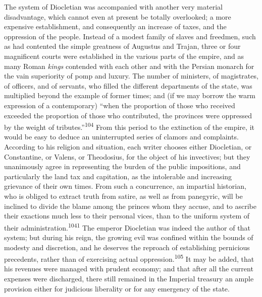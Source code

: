 
The system of Diocletian was accompanied with another very
material disadvantage, which cannot even at present be totally
overlooked; a more expensive establishment, and consequently an
increase of taxes, and the oppression of the people. Instead of a
modest family of slaves and freedmen, such as had contented the
simple greatness of Augustus and Trajan, three or four
magnificent courts were established in the various parts of the
empire, and as many Roman \textit{kings} contended with each other and
with the Persian monarch for the vain superiority of pomp and
luxury. The number of ministers, of magistrates, of officers, and
of servants, who filled the different departments of the state,
was multiplied beyond the example of former times; and (if we may
borrow the warm expression of a contemporary) “when the
proportion of those who received exceeded the proportion of those
who contributed, the provinces were oppressed by the weight of
tributes.”\textsuperscript{104} From this period to the extinction of the empire,
it would be easy to deduce an uninterrupted series of clamors and
complaints. According to his religion and situation, each writer
chooses either Diocletian, or Constantine, or Valens, or
Theodosius, for the object of his invectives; but they
unanimously agree in representing the burden of the public
impositions, and particularly the land tax and capitation, as the
intolerable and increasing grievance of their own times. From
such a concurrence, an impartial historian, who is obliged to
extract truth from satire, as well as from panegyric, will be
inclined to divide the blame among the princes whom they accuse,
and to ascribe their exactions much less to their personal vices,
than to the uniform system of their administration.\textsuperscript{1041} The
emperor Diocletian was indeed the author of that system; but
during his reign, the growing evil was confined within the bounds
of modesty and discretion, and he deserves the reproach of
establishing pernicious precedents, rather than of exercising
actual oppression.\textsuperscript{105} It may be added, that his revenues were
managed with prudent economy; and that after all the current
expenses were discharged, there still remained in the Imperial
treasury an ample provision either for judicious liberality or
for any emergency of the state.

